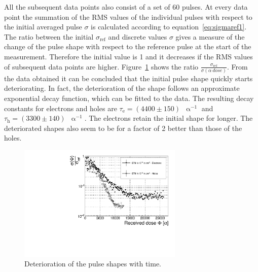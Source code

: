 All the subsequent data points also consist of a set of 60 pulses. At every data point the summation of the RMS values of the individual pulses with respect to the initial averaged pulse $\sigma$ is calculated according to equation~\ref{eq:sigmaref1}. The ratio between the initial $\sigma_{\mathrm{ref}}$ and discrete values $\sigma$ gives a measure of the change of the pulse shape with respect to the reference pulse at the start of the measurement. Therefore the initial value is 1 and it decreases if the RMS values of subsequent data points are higher.
Figure~\ref{fig:longtermc2corr} shows the ratio $\frac{\sigma_\mathrm{ref} }{\sigma(\alpha~dose)}$. From the data obtained it can be concluded that the initial pulse shape quickly starts deteriorating. In fact, the deterioration of the shape follows an approximate exponential decay function, which can be fitted to the data. The resulting decay constants for electrons and holes are $\tau_{\mathrm{e}}=(4400\pm150)$~$\upalpha^{-1}$ and $\tau_{\mathrm{h}}=(3300\pm140)$~$\upalpha^{-1}$. The electrons retain the initial shape for longer. The deteriorated shapes also seem to be for a factor of 2 better than those of the holes. 

\begin{figure}[!t]
\begin{center}
\includegraphics[width=0.7\textwidth]{03_measurement_results/scripts/plots/plotLifetime/corrlifetime}
\caption{Deterioration of the pulse shapes with time.}
\label{fig:longtermc2corr}
\end{center}
\end{figure}


